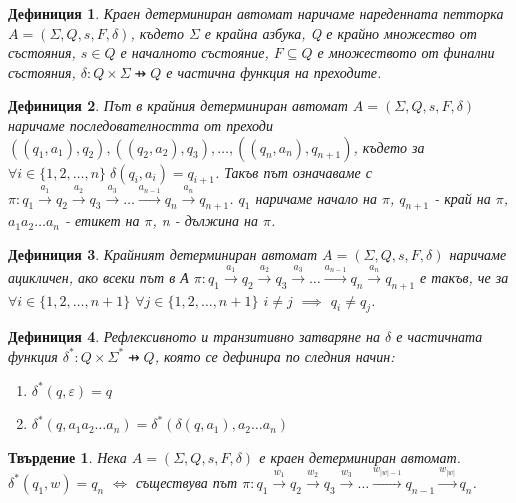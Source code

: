 \documentclass[a4paper,12pt]{article}
\newtheorem{stm}{Твърдение}[section]
\newtheorem{defn}{Дефиниция}[section]
\begin{document}
\begin{defn}
Краен детерминиран автомат наричаме нареденната петторка $A = ( \Sigma, Q, s, F, \delta )$, където
$\Sigma$ е крайна азбука, Q е крайно множество от състояния, $s \in Q$ е началното състояние, $F \subseteq Q$ е множеството от финални състояния,
$\delta : Q \times \Sigma \pfun Q$ е частична функция на преходите.
\end{defn}

\begin{defn}
Път в крайния детерминиран автомат $A = ( \Sigma, Q, s, F, \delta )$ наричаме последователността от преходи
$((q_1, a_1), q_2), ((q_2, a_2), q_3), \ldots, ((q_n, a_n), q_{n+1})$, където за $\forall i \in \{1, 2, \ldots, n\} \;\delta(q_i, a_i)=q_{i+1}$.
Такъв път означаваме с $\pi: q_1 \xrightarrow{a_1} q_2 \xrightarrow{a_2} q_3 \xrightarrow{a_3} \ldots \xrightarrow{a_{n  - 1}} q_n \xrightarrow{a_n} q_{n+1}$.
$q_1$ наричаме начало на $\pi$, $q_{n + 1}$ - край на $\pi$, $a_1 a_2 \ldots a_n$ - етикет на $\pi$, n - дължина на $\pi$.
\end{defn}

\begin{defn}
Крайният детерминиран автомат $A = ( \Sigma, Q, s, F, \delta )$ наричаме ацикличен, ако всеки път в А
$\pi: q_1 \xrightarrow{a_1} q_2 \xrightarrow{a_2} q_3 \xrightarrow{a_3} \ldots \xrightarrow{a_{n  - 1}} q_n \xrightarrow{a_n} q_{n+1}$
е такъв, че за $\forall i \in \{1, 2, \ldots, n+1\}$ $\forall j \in \{1, 2, \ldots, n+1\}$ $i \neq j$ $\implies$ $q_i \neq q_j$.
\end{defn}

\begin{defn}
Рефлексивното и транзитивно затваряне на $\delta$ е частичната функция $\delta^* : Q \times \Sigma^* \pfun Q $, която се дефинира по следния начин:
\begin{enumerate}
 \item[1)] $\delta^*(q, \varepsilon) = q$
 \item[2)] $\delta^*(q, a_1 a_2 \ldots a_n) = \delta^*(\delta(q, a_1), a_2 \ldots a_n)$
\end{enumerate}
\end{defn}

\begin{stm}
Нека $A = (\Sigma, Q, s, F, \delta)$ е краен детерминиран автомат. \\$\delta^*(q_1, w) = q_n$ $\Leftrightarrow$ съществува път
$\pi: q_1 \xrightarrow{w_1} q_2 \xrightarrow{w_2} q_3 \xrightarrow{w_3} \ldots \xrightarrow{w_{|w| - 1}} q_{n - 1} \xrightarrow{w_{|w|}} q_n$.
\end{stm}
\end{document}
